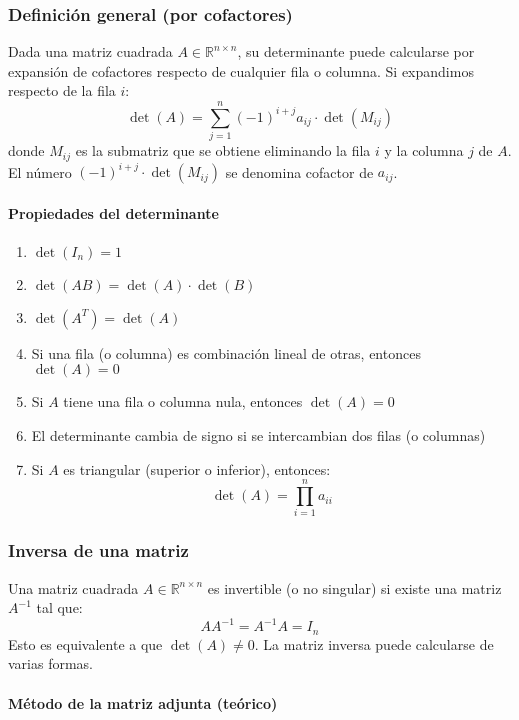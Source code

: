 \subsubsection{Definición general (por cofactores)}

Dada una matriz cuadrada \(A \in \mathbb{R}^{n \times n}\), su determinante puede calcularse por expansión de cofactores respecto de cualquier fila o columna. Si expandimos respecto de la fila \(i\):
\[
\det(A) = \sum_{j=1}^n (-1)^{i+j} a_{ij} \cdot \det(M_{ij})
\]
donde \(M_{ij}\) es la submatriz que se obtiene eliminando la fila \(i\) y la columna \(j\) de \(A\). El número \((-1)^{i+j} \cdot \det(M_{ij})\) se denomina cofactor de \(a_{ij}\).

\paragraph{Propiedades del determinante}
\begin{enumerate}
    \item \(\det(I_n) = 1\)
    \item \(\det(AB) = \det(A) \cdot \det(B)\)
    \item \(\det(A^T) = \det(A)\)
    \item Si una fila (o columna) es combinación lineal de otras, entonces \(\det(A) = 0\)
    \item Si \(A\) tiene una fila o columna nula, entonces \(\det(A) = 0\)
    \item El determinante cambia de signo si se intercambian dos filas (o columnas)
    \item Si \(A\) es triangular (superior o inferior), entonces:
    \[
        \det(A) = \prod_{i=1}^n a_{ii}
    \]
\end{enumerate}

\subsubsection{Inversa de una matriz}

Una matriz cuadrada \(A \in \mathbb{R}^{n \times n}\) es invertible (o no singular) si existe una matriz \(A^{-1}\) tal que:
\[
AA^{-1} = A^{-1}A = I_n
\]
Esto es equivalente a que \(\det(A) \neq 0\). La matriz inversa puede calcularse de varias formas.

\paragraph{Método de la matriz adjunta (teórico)}

